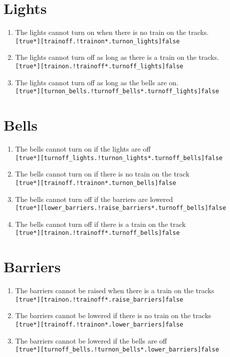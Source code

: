 \documentclass[final]{report}
\begin{document}
\section{Lights}

\begin{enumerate}
	\item The lights cannot turn on when there is no train on the tracks.\\
		\texttt{[true*][trainoff.!trainon*.turnon\_lights]false}

	\item The lights cannot turn off as long as there is a train on the tracks.\\
		\texttt{[true*][trainon.!trainoff*.turnoff\_lights]false}

	\item The lights cannot turn off as long as the bells are on.\\
		\texttt{[true*][turnon\_bells.!turnoff\_bells*.turnoff\_lights]false}
\end{enumerate}


\section{Bells}

\begin{enumerate}
	\item The bells cannot turn on if the lights are off\\
		\texttt{[true*][turnoff\_lights.!turnon\_lights*.turnoff\_bells]false}
	\item The bells cannot turn on if there is no train on the track\\
		\texttt{[true*][trainoff.!trainon*.turnon\_bells]false}
	\item The bells cannot turn off if the barriers are lowered\\
		\texttt{[true*][lower\_barriers.!raise\_barriers*.turnoff\_bells]false}
	\item The bells cannot turn off if there is a train on the track\\
		\texttt{[true*][trainon.!trainoff*.turnoff\_bells]false}
\end{enumerate}


\section{Barriers}

\begin{enumerate}
	\item The barriers cannot be raised when there is a train on the tracks\\
		\texttt{[true*][trainon.!trainoff*.raise\_barriers]false}
	\item The barriers cannot be lowered if there is no train on the tracks\\
		\texttt{[true*][trainoff.!trainon*.lower\_barriers]false}
	\item The barriers cannot be lowered if the bells are off\\
		\texttt{[true*][turnoff\_bells.!turnon\_bells*.lower\_barriers]false}
\end{enumerate}
\end{document}
